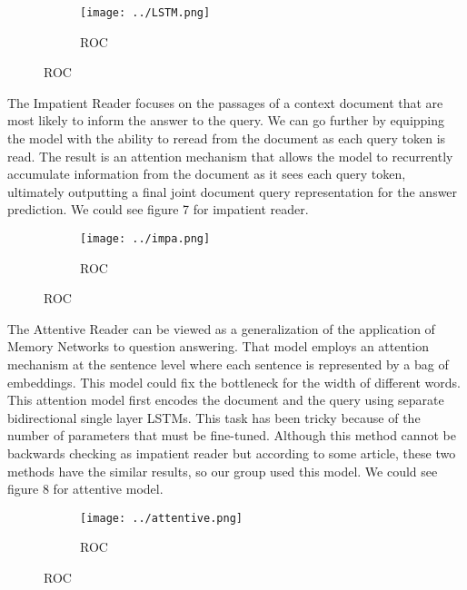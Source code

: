 \documentclass[runningheads,a4paper]{llncs}
\begin{document}
\begin{figure}[p]
	\centering
	\begin{subfigure}{.5\textwidth}
		\centering
		\texttt{[image: ../LSTM.png]}
		\caption{ROC}
		\label{figure 6:LSTM}
	\end{subfigure}
	
\end{figure}



The Impatient Reader focuses on the passages of a context document that are most likely to inform the answer to the query. We can go further by equipping the model with the ability to reread from the document as each query token is read. The result is an attention mechanism that allows the model to recurrently accumulate information from the document as it sees each query token, ultimately outputting a final joint document query representation for the answer prediction. We could see figure 7 for impatient reader.
\begin{figure}[p]
	\centering
	\begin{subfigure}{.5\textwidth}
		\centering
		\texttt{[image: ../impa.png]}
		\caption{ROC}
		\label{figure 7:impatient reader}
	\end{subfigure}
	
\end{figure}

The Attentive Reader can be viewed as a generalization of the application of Memory Networks to question answering. That model employs an attention mechanism at the sentence level where each sentence is represented by a bag of embeddings. This model could fix the bottleneck for the width of different words. This attention model first encodes the document and the query using separate bidirectional single layer LSTMs. This task has been tricky because of the number of parameters that must be fine-tuned.
Although this method cannot be backwards checking as impatient reader but according to some article, these two methods have the similar results, so our group used this model. We could see figure 8 for attentive model.
\begin{figure}[p]
	\centering
	\begin{subfigure}{.5\textwidth}
		\centering
		\texttt{[image: ../attentive.png]}
		\caption{ROC}
		\label{figure 8:attentive model}
	\end{subfigure}
	
\end{figure}
\end{document}
